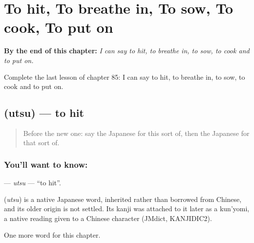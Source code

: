 
\chapter{To hit, To breathe in, To sow, To cook, To put on}
\label{ch:ja-to-hit-to-breathe-in-to-sow-to-cook-to-put-on}

\begin{chapteropening}
\textbf{By the end of this chapter:} \emph{I can say to hit, to breathe in, to sow, to cook and to put on.}

Complete the last lesson of chapter 85: I can say to hit, to breathe in, to sow, to cook and to put on.
\end{chapteropening}

\section[\texorpdfstring{\ja{うつ} (utsu)}{うつ (utsu)}]{ (utsu) — to hit}

\label{lesson:JA-C85-utsu}



\begin{quote}
Before the new one: say the Japanese for this sort of, then the Japanese for that sort of.
\end{quote}

\subsection*{You'll want to know: }
\textbf{} — \emph{utsu} — \textquotedblleft{}to hit\textquotedblright{}.

\begin{cousinweb}
\textbf{} (\emph{utsu}) is a native Japanese word, inherited rather than borrowed from Chinese, and its older origin is not settled. Its kanji was attached to it later as a kun'yomi, a native reading given to a Chinese character (JMdict, KANJIDIC2).
\end{cousinweb}

\begin{grammarlens}[title={What you've built}]
One more word for this chapter.
\end{grammarlens}


